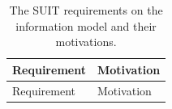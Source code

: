 \documentclass[0-thesis.tex]{subfiles}
\begin{document}
\begin{small}
\begin{longtable}[]{@{}ll@{}}
    \caption{The SUIT requirements on the information model and their motivations.}
    \label{tab:information-evaluation}\\
    \toprule
    \begin{minipage}[b]{0.37\columnwidth}\raggedright\strut
    Requirement\strut
    \end{minipage} & \begin{minipage}[b]{0.57\columnwidth}\raggedright\strut
    Motivation\strut
    \end{minipage}\tabularnewline
    \midrule
    \endfirsthead
    \toprule
    \begin{minipage}[b]{0.37\columnwidth}\raggedright\strut
    Requirement\strut
    \end{minipage} & \begin{minipage}[b]{0.57\columnwidth}\raggedright\strut
    Motivation\strut
    \end{minipage}\tabularnewline
    \midrule
    \endhead


\end{longtable}
\end{small}
\end{document}
